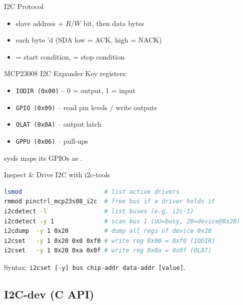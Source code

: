 
\begin{concept}{I2C Protocol}
    \begin{itemize}
        \item {} slave address + $R/\overline{W}$ bit, then 
              data bytes
        \item each byte 'd (SDA low = ACK, high = NACK)
        \item {} = start condition,  = stop condition
    \end{itemize}
\end{concept}

\begin{definition}{MCP23008 I2C Expander}
    Key registers:
    \begin{itemize}
        \item \texttt{IODIR (0x00)} -- 0 = output, 1 = input
        \item \texttt{GPIO (0x09)} -- read pin levels / write outputs
        \item \texttt{OLAT (0x0A)} -- output latch
        \item \texttt{GPPU (0x06)} -- pull-ups
    \end{itemize}
    sysfs maps its GPIOs as .
\end{definition}

\multend

\begin{KR}{Inspect \& Drive I2C with i2c-tools}
\begin{lstlisting}[language=bash, style=basesmol, aboveskip=2pt, belowskip=2pt]
lsmod                       # list active drivers
rmmod pinctrl_mcp23s08_i2c  # free bus if a driver holds it
i2cdetect -l                # list buses (e.g. i2c-1)
i2cdetect -y 1              # scan bus 1 (UU=busy, 20=device@0x20)
i2cdump  -y 1 0x20          # dump all regs of device 0x20
i2cset   -y 1 0x20 0x0 0xf0 # write reg 0x00 = 0xf0 (IODIR)
i2cset   -y 1 0x20 0xa 0x0f # write reg 0x0a = 0x0f (OLAT)
\end{lstlisting}
    Syntax: \texttt{i2cset [-y] bus chip-addr data-addr [value]}.
\end{KR}

\subsection{I2C-dev (C API)}


